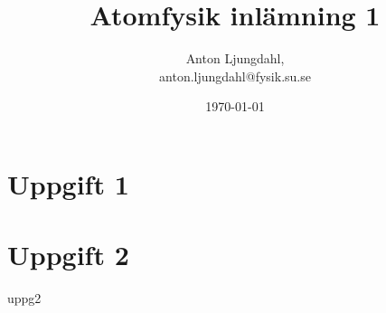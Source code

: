 \documentclass[12pt,a4paper]{article}
\numberwithin{equation}{section}
\begin{document}
\author{Anton Ljungdahl, \\
\small{anton.ljungdahl@fysik.su.se}}
\title{Atomfysik inlämning 1}
\date{\today}
\maketitle

\section{Uppgift 1}

\section{Uppgift 2}
{uppg2}
\end{document}
